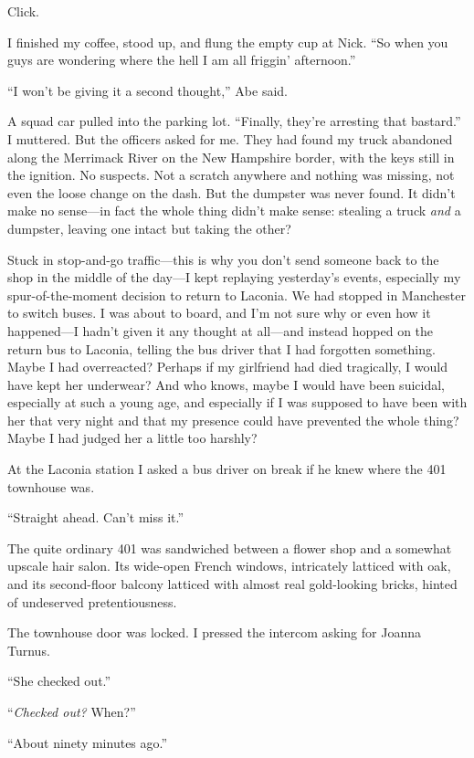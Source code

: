 Click.

I finished my coffee, stood up, and flung the empty cup at Nick. ``So
when you guys are wondering where the hell I am all friggin'
afternoon.''

``I won't be giving it a second thought,'' Abe said.

A squad car pulled into the parking lot. ``Finally, they're arresting
that bastard.'' I muttered. But the officers asked for me. They had
found my truck abandoned along the Merrimack River on the New Hampshire
border, with the keys still in the ignition. No suspects. Not a scratch
anywhere and nothing was missing, not even the loose change on the dash.
But the dumpster was never found. It didn't make no sense---in fact the
whole thing didn't make sense: stealing a truck \emph{and} a dumpster,
leaving one intact but taking the other?

Stuck in stop-and-go traffic---this is why you don't send someone back
to the shop in the middle of the day---I kept replaying yesterday's
events, especially my spur-of-the-moment decision to return to Laconia.
We had stopped in Manchester to switch buses. I was about to board, and
I'm not sure why or even how it happened---I hadn't given it any thought
at all---and instead hopped on the return bus to Laconia, telling the
bus driver that I had forgotten something. Maybe I had overreacted?
Perhaps if my girlfriend had died tragically, I would have kept her
underwear? And who knows, maybe I would have been suicidal, especially
at such a young age, and especially if I was supposed to have been with
her that very night and that my presence could have prevented the whole
thing? Maybe I had judged her a little too harshly?

At the Laconia station I asked a bus driver on break if he knew where
the 401 townhouse was.

``Straight ahead. Can't miss it.''

The quite ordinary 401 was sandwiched between a flower shop and a
somewhat upscale hair salon. Its wide-open French windows, intricately
latticed with oak, and its second-floor balcony latticed with almost
real gold-looking bricks, hinted of undeserved pretentiousness.

The townhouse door was locked. I pressed the intercom asking for Joanna
Turnus.

``She checked out.''

``\emph{Checked out?} When?''

``About ninety minutes ago.''

